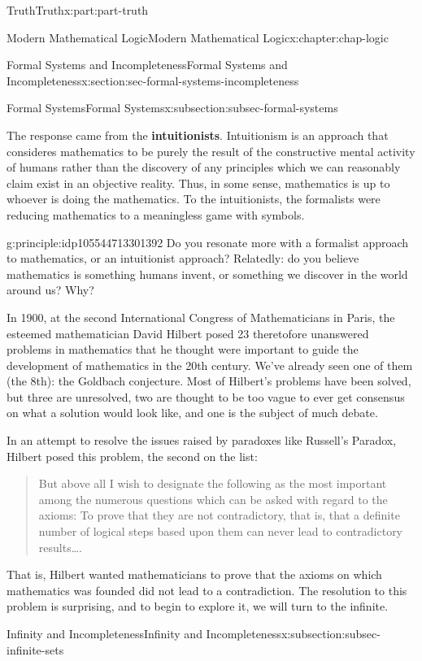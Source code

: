 \documentclass[oneside,10pt,]{book}
\newcommand{\terminology}[1]{\textbf{#1}}
\numberwithin{equation}{section}
\begin{document}
\begin{partptx}{Truth}{}{Truth}{}{}{x:part:part-truth}
\begin{chapterptx}{Modern Mathematical Logic}{}{Modern Mathematical Logic}{}{}{x:chapter:chap-logic}
\begin{sectionptx}{Formal Systems and Incompleteness}{}{Formal Systems and Incompleteness}{}{}{x:section:sec-formal-systems-incompleteness}
\begin{subsectionptx}{Formal Systems}{}{Formal Systems}{}{}{x:subsection:subsec-formal-systems}
\par
The response came from the \terminology{intuitionists}. Intuitionism is an approach that consideres mathematics to be purely the result of the constructive mental activity of humans rather than the discovery of any principles which we can reasonably claim exist in an objective reality. Thus, in some sense, mathematics is up to whoever is doing the mathematics. To the intuitionists, the formalists were reducing mathematics to a meaningless game with symbols.%
\begin{principle}{}{}{g:principle:idp105544713301392}%
Do you resonate more with a formalist approach to mathematics, or an intuitionist approach? Relatedly: do you believe mathematics is something humans invent, or something we discover in the world around us? Why?%
\end{principle}
In 1900, at the second International Congress of Mathematicians in Paris, the esteemed mathematician David Hilbert posed 23 theretofore unanswered problems in mathematics that he thought were important to guide the development of mathematics in the 20th century. We've already seen one of them (the 8th): the Goldbach conjecture. Most of Hilbert's problems have been solved, but three are unresolved, two are thought to be too vague to ever get consensus on what a solution would look like, and one is the subject of much debate.%
\par
In an attempt to resolve the issues raised by paradoxes like Russell's Paradox, Hilbert posed this problem, the second on the list:%
\begin{quote}%
But above all I wish to designate the following as the most important among the numerous questions which can be asked with regard to the axioms: To prove that they are not contradictory, that is, that a definite number of logical steps based upon them can never lead to contradictory results….\end{quote}
That is, Hilbert wanted mathematicians to prove that the axioms on which mathematics was founded did not lead to a contradiction. The resolution to this problem is surprising, and to begin to explore it, we will turn to the infinite.%
\end{subsectionptx}
%
%
\typeout{************************************************}
\typeout{************************************************}
%
\begin{subsectionptx}{Infinity and Incompleteness}{}{Infinity and Incompleteness}{}{}{x:subsection:subsec-infinite-sets}

\end{subsectionptx}
\end{sectionptx}
\end{chapterptx}
\end{partptx}
\end{document}
